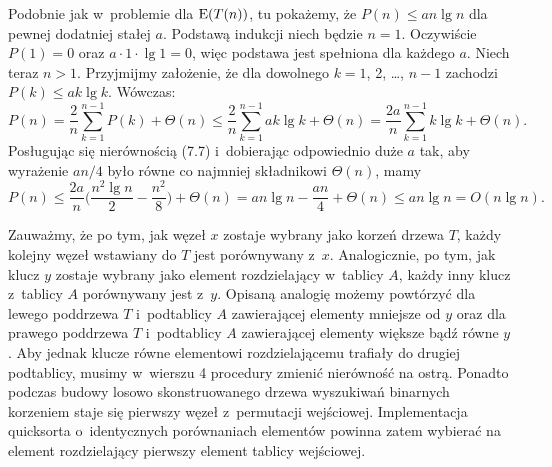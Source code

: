 \subproblem %
Podobnie jak w~problemie  dla $\operatorname{E}(T(n))$, tu pokażemy, że $P(n)\le an\lg n$ dla pewnej dodatniej stałej $a$.
Podstawą indukcji niech będzie $n=1$.
Oczywiście $P(1)=0$ oraz $a\cdot1\cdot\lg1=0$, więc podstawa jest spełniona dla każdego $a$.
Niech teraz $n>1$.
Przyjmijmy założenie, że dla dowolnego $k=1$, 2, \dots, $n-1$ zachodzi $P(k)\le ak\lg k$.
Wówczas:
\[
	P(n) = \frac{2}{n}\sum_{k=1}^{n-1}P(k)+\Theta(n) \le \frac{2}{n}\sum_{k=1}^{n-1}ak\lg k+\Theta(n) = \frac{2a}{n}\sum_{k=1}^{n-1}{k\lg k}+\Theta(n).
\]
Posługując się nierównością (7.7) i~dobierając odpowiednio duże $a$ tak, aby wyrażenie $an/4$ było równe co najmniej składnikowi $\Theta(n)$, mamy
\[
	P(n) \le \frac{2a}{n}\biggl(\frac{n^2\lg n}{2}-\frac{n^2}{8}\biggr)+\Theta(n) = an\lg n-\frac{an}{4}+\Theta(n) \le an\lg n = O(n\lg n).
\]

\subproblem %
Zauważmy, że po tym, jak węzeł $x$ zostaje wybrany jako korzeń drzewa $T$, każdy kolejny węzeł wstawiany do $T$ jest porównywany z~$x$.
Analogicznie, po tym, jak klucz $y$ zostaje wybrany jako element rozdzielający w~tablicy $A$, każdy inny klucz z~tablicy $A$ porównywany jest z~$y$.
Opisaną analogię możemy powtórzyć dla lewego poddrzewa $T$ i~podtablicy $A$ zawierającej elementy mniejsze od $y$ oraz dla prawego poddrzewa $T$ i~podtablicy $A$ zawierającej elementy większe bądź równe $y$.
Aby jednak klucze równe elementowi rozdzielającemu trafiały do drugiej podtablicy, musimy w~wierszu 4 procedury  zmienić nierówność na ostrą.
Ponadto podczas budowy losowo skonstruowanego drzewa wyszukiwań binarnych korzeniem staje się pierwszy węzeł z~permutacji wejściowej.
Implementacja quicksorta o~identycznych porównaniach elementów powinna zatem wybierać na element rozdzielający pierwszy element tablicy wejściowej.

